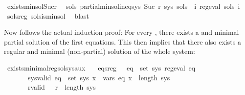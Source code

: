 \begin{isabellebody}
\isamarkupfalse%
\ exists{\isacharunderscore}{\kern0pt}min{\isacharunderscore}{\kern0pt}sol{\isacharunderscore}{\kern0pt}Suc{\isacharunderscore}{\kern0pt}r{\isacharcolon}{\kern0pt}\isanewline
\ \ {\isachardoublequoteopen}{\isasymexists}sols{\isacharprime}{\kern0pt}{\isachardot}{\kern0pt}\ partial{\isacharunderscore}{\kern0pt}min{\isacharunderscore}{\kern0pt}sol{\isacharunderscore}{\kern0pt}ineq{\isacharunderscore}{\kern0pt}sys\ {\isacharparenleft}{\kern0pt}Suc\ r{\isacharparenright}{\kern0pt}\ sys\ sols{\isacharprime}{\kern0pt}\ {\isasymand}\ {\isacharparenleft}{\kern0pt}{\isasymforall}i{\isachardot}{\kern0pt}\ reg{\isacharunderscore}{\kern0pt}eval\ {\isacharparenleft}{\kern0pt}sols{\isacharprime}{\kern0pt}\ i{\isacharparenright}{\kern0pt}{\isacharparenright}{\kern0pt}{\isachardoublequoteclose}\isanewline
%
\isadelimproof
\ \ %
\endisadelimproof
%
\isatagproof
{}\isamarkupfalse%
\ sols{\isacharprime}{\kern0pt}{\isacharunderscore}{\kern0pt}reg\ sols{\isacharprime}{\kern0pt}{\isacharunderscore}{\kern0pt}is{\isacharunderscore}{\kern0pt}min{\isacharunderscore}{\kern0pt}sol\ \isamarkupfalse%
\ blast%
\endisatagproof
{\isafoldproof}%
%
\isadelimproof
\isanewline
%
\endisadelimproof
\isanewline
{}\isamarkupfalse%
%
\begin{isamarkuptext}%
Now follows the actual induction proof: For every , there exists a  and minimal partial
solution of the first  equations. This then implies that there also exists a regular and minimal (non-partial)
solution of the whole system:%
\end{isamarkuptext}\isamarkuptrue%
\isamarkupfalse%
\ exists{\isacharunderscore}{\kern0pt}minimal{\isacharunderscore}{\kern0pt}reg{\isacharunderscore}{\kern0pt}sol{\isacharunderscore}{\kern0pt}sys{\isacharunderscore}{\kern0pt}aux{\isacharcolon}{\kern0pt}\isanewline
\ \ \ eqs{\isacharunderscore}{\kern0pt}reg{\isacharcolon}{\kern0pt}\ \ \ {\isachardoublequoteopen}{\isasymforall}eq\ {\isasymin}\ set\ sys{\isachardot}{\kern0pt}\ reg{\isacharunderscore}{\kern0pt}eval\ eq{\isachardoublequoteclose}\isanewline
\ \ \ \ \ \ \ sys{\isacharunderscore}{\kern0pt}valid{\isacharcolon}{\kern0pt}\ {\isachardoublequoteopen}{\isasymforall}eq\ {\isasymin}\ set\ sys{\isachardot}{\kern0pt}\ {\isasymforall}x\ {\isasymin}\ vars\ eq{\isachardot}{\kern0pt}\ x\ {\isacharless}{\kern0pt}\ length\ sys{\isachardoublequoteclose}\isanewline
\ \ \ \ \ \ \ r{\isacharunderscore}{\kern0pt}valid{\isacharcolon}{\kern0pt}\ \ \ {\isachardoublequoteopen}r\ {\isasymle}\ length\ sys{\isachardoublequoteclose}\ \ \ \isanewline

\end{isabellebody}
